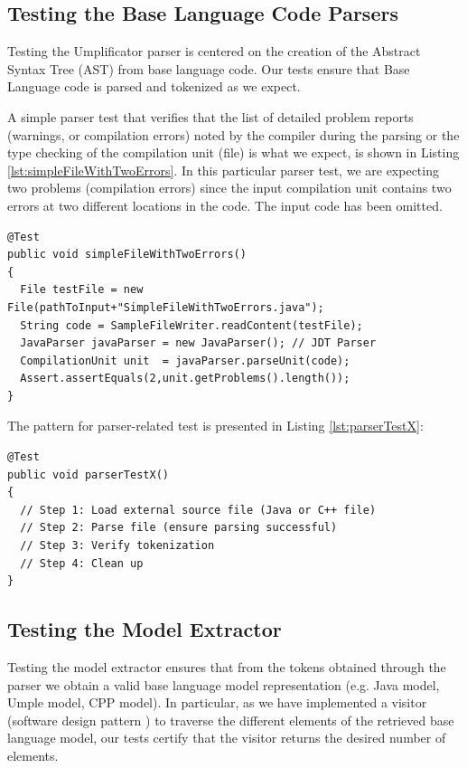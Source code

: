 \subsection{Testing the Base Language Code Parsers}

Testing the Umplificator parser is centered on the creation of the Abstract Syntax Tree (AST) from base language code. Our tests ensure that Base Language code is parsed and tokenized as we expect.

A simple parser test that verifies that the list of detailed problem reports (warnings, or compilation errors) noted by the compiler during the parsing or the type checking of the compilation unit (file) is what we expect, is shown in Listing \ref{lst:simpleFileWithTwoErrors}.
In this particular parser test, we are expecting two problems (compilation errors) since the input compilation unit contains two errors at two different locations in the code. The input code has been omitted. 

\begin{lstlisting}[style=java, label={lst:simpleFileWithTwoErrors}, caption=A Parser Test]
@Test
public void simpleFileWithTwoErrors()
{
  File testFile = new File(pathToInput+"SimpleFileWithTwoErrors.java");
  String code = SampleFileWriter.readContent(testFile);
  JavaParser javaParser = new JavaParser(); // JDT Parser
  CompilationUnit unit  = javaParser.parseUnit(code);
  Assert.assertEquals(2,unit.getProblems().length());
}
\end{lstlisting}

The pattern for parser-related test is presented in Listing \ref{lst:parserTestX}:

\begin{lstlisting}[style=java, label={lst:parserTestX}, caption=A pattern for parser tests]
@Test
public void parserTestX()
{
  // Step 1: Load external source file (Java or C++ file)
  // Step 2: Parse file (ensure parsing successful) 
  // Step 3: Verify tokenization
  // Step 4: Clean up
}
\end{lstlisting}

\subsection{Testing the Model Extractor}

Testing the model extractor ensures that from the tokens obtained through the parser we obtain a valid base language model representation (e.g. Java model, Umple model, CPP model). In particular, as we have implemented a visitor (software design pattern \cite{gamma1994design}) to traverse the different elements of the retrieved base language model, our tests certify that the visitor returns the desired number of elements.

